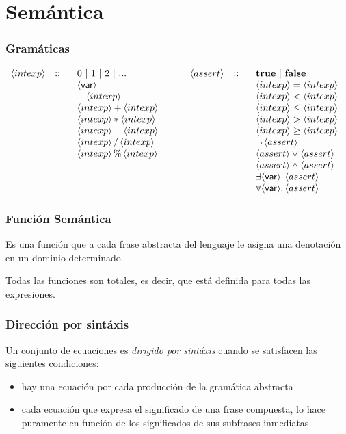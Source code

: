 \section{Semántica}
  \subsubsection*{Gramáticas}
    $\begin{array}{llllll}
      \intexp & ::= & 0\ | \ 1\ | \ 2\ | \ ... & \assert & ::= & \textbf{true}\ |\ \textbf{false}\ \\
      & & \var\   & & & \intexp = \intexp\ \\
      & & -\intexp\  & & & \intexp < \intexp\ \\ 
      & & \intexp + \intexp\ \qquad & & & \intexp \leq \intexp\ \\ 
      & & \intexp * \intexp\  & & & \intexp > \intexp\ \\
      & & \intexp - \intexp\ & & & \intexp \geq \intexp\ \\
      & & \intexp / \intexp\  & & & \neg\assert\ \\
      & & \intexp \% \intexp & & & \assert \vee\assert\ \\
      & & & & & \assert \wedge\assert\ \\
      & & & & & \exists\var . \assert  \\
      & & & & & \forall\var . \assert  \\
    \end{array}$

  \subsubsection*{Función Semántica}
    \PN Es una función que a cada frase abstracta del lenguaje le asigna una denotación en un dominio determinado.

  \vspace{3mm}
  \PN Todas las funciones son totales, es decir, que está definida para todas las expresiones.

  \subsubsection*{Dirección por sintáxis}
    \PN Un conjunto de ecuaciones es \textit{dirigido por sintáxis} cuando se satisfacen las siguientes condiciones:
    \begin{itemize}
      \item hay una ecuación por cada producción de la gramática abstracta
      \item cada ecuación que expresa el significado de una frase compuesta, lo hace puramente en función de los significados de sus subfrases inmediatas
    \end{itemize}
    
